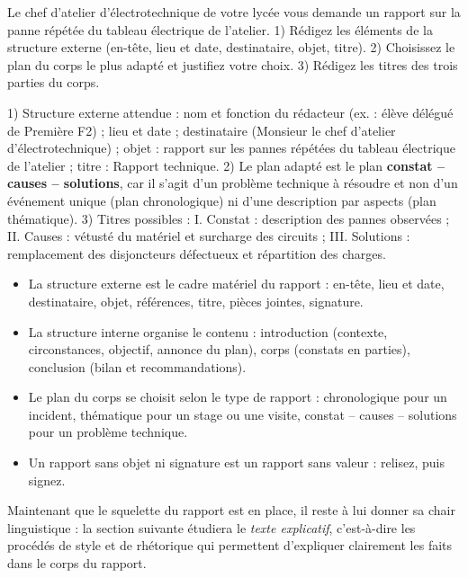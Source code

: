 \documentclass[11pt]{article}
\newcommand{\cle}[1]{{\popxbold\color{popdark}#1}}
\begin{document}
\begin{exercice}
Le chef d'atelier d'électrotechnique de votre lycée vous demande un rapport sur la panne répétée du tableau électrique de l'atelier. 1) Rédigez les éléments de la structure externe (en-tête, lieu et date, destinataire, objet, titre). 2) Choisissez le plan du corps le plus adapté et justifiez votre choix. 3) Rédigez les titres des trois parties du corps.
\end{exercice}

\begin{corrige}
1) Structure externe attendue : nom et fonction du rédacteur (ex. : élève délégué de Première F2) ; lieu et date ; destinataire (Monsieur le chef d'atelier d'électrotechnique) ; objet : rapport sur les pannes répétées du tableau électrique de l'atelier ; titre : Rapport technique. 2) Le plan adapté est le plan \textbf{constat -- causes -- solutions}, car il s'agit d'un problème technique à résoudre et non d'un événement unique (plan chronologique) ni d'une description par aspects (plan thématique). 3) Titres possibles : I. Constat : description des pannes observées ; II. Causes : vétusté du matériel et surcharge des circuits ; III. Solutions : remplacement des disjoncteurs défectueux et répartition des charges.
\end{corrige}

\begin{aretenir}
\begin{itemize}
\item La \cle{structure externe} est le cadre matériel du rapport : en-tête, lieu et date, destinataire, objet, références, titre, pièces jointes, signature.
\item La \cle{structure interne} organise le contenu : introduction (contexte, circonstances, objectif, annonce du plan), corps (constats en parties), conclusion (bilan et recommandations).
\item Le plan du corps se choisit selon le type de rapport : chronologique pour un incident, thématique pour un stage ou une visite, constat -- causes -- solutions pour un problème technique.
\item Un rapport sans objet ni signature est un rapport sans valeur : relisez, puis signez.
\end{itemize}
\end{aretenir}

Maintenant que le squelette du rapport est en place, il reste à lui donner sa chair linguistique : la section suivante étudiera le \emph{texte explicatif}, c'est-à-dire les procédés de style et de rhétorique qui permettent d'expliquer clairement les faits dans le corps du rapport.
\end{document}
